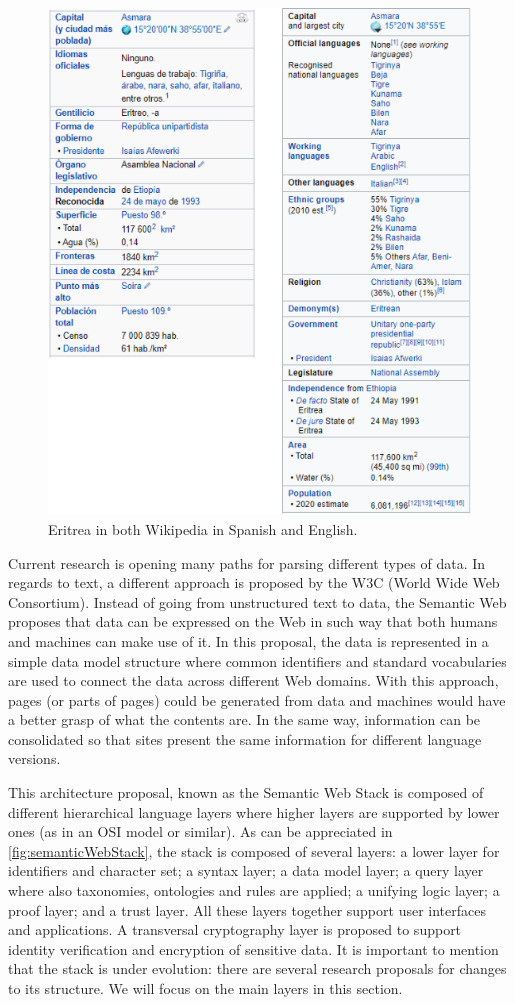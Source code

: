 \begin{figure}[!ht]
    \centering
        \includegraphics[width=.8\linewidth]{imagenes/EritreaWikipedia.png}
        \caption{Eritrea in both Wikipedia in Spanish and English.}
        \label{fig:eritreaWikipedia}
\end{figure}

Current research is opening many paths for parsing different types of data. In regards to text, a different approach is proposed by the W3C (World Wide Web Consortium). Instead of going from unstructured text to data, the Semantic Web proposes that data can be expressed on the Web in such way that both humans and machines can make use of it. In this proposal, the data is represented in a simple data model structure where common identifiers and standard vocabularies are used to connect the data across different Web domains. With this approach, pages (or parts of pages) could be generated from data and machines would have a better grasp of what the contents are. In the same way, information can be consolidated so that sites present the same information for different language versions.

This architecture proposal, known as the Semantic Web Stack is composed of different hierarchical language layers where higher layers are supported by lower ones (as in an OSI model or similar). As can be appreciated in \autoref{fig:semanticWebStack}, the stack is composed of several layers: a lower layer for identifiers and character set; a syntax layer; a data model layer; a query layer where also taxonomies, ontologies and rules are applied; a unifying logic layer; a proof layer; and a trust layer. All these layers together support user interfaces and applications. A transversal cryptography layer is proposed to support identity verification and encryption of sensitive data. It is important to mention that the stack is under evolution: there are several research proposals for changes to its structure. We will focus on the main layers in this section.

